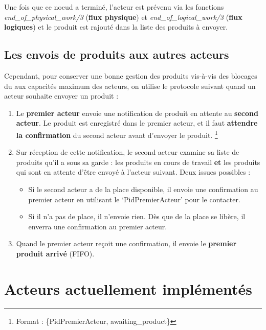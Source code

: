 \documentclass[12pt,a4paper]{article}
\begin{document}
			Une fois que ce noeud a terminé, l'acteur est prévenu via les
			fonctions \textit{end\_of\_physical\_work/3} (\textbf{flux physique})
			et \textit{end\_of\_logical\_work/3} (\textbf{flux logiques}) et le produit
			est rajouté dans la liste des produits à envoyer.

		\subsection{Les envois de produits aux autres acteurs}
			Cependant, pour conserver une bonne gestion des produits vis-à-vis
			des blocages du aux capacités maximum des acteurs, on utilise le 
			protocole suivant quand un acteur souhaite envoyer un produit :

			\begin{enumerate}
				\item Le \textbf{premier acteur} envoie une notification de produit
					en attente au \textbf{second acteur}. Le produit est 
					enregistré dans le premier acteur, et il faut 
					\textbf{attendre la confirmation} du second acteur avant
					d'envoyer le produit.
					\footnote{Format : \{PidPremierActeur, awaiting\_product\}}
				
				\item Sur réception de cette notification, le second acteur 
					examine sa liste de produits qu'il a sous sa garde :
					les produits en cours de travail \textbf{et} les produits
					qui sont en attente d'être envoyé à l'acteur suivant.
					Deux issues possibles :
					\begin{itemize}
						\item Si le second acteur a de la place disponible, 
							il envoie une confirmation au premier acteur en
							utilisant le `PidPremierActeur' pour le contacter.
						\item Si il n'a pas de place, il n'envoie rien. Dès 
							que de la place se libère, il enverra une 
							confirmation au premier acteur.
					\end{itemize}

				\item Quand le premier acteur reçoit une confirmation,
					il envoie le \textbf{premier produit arrivé} (FIFO).
			\end{enumerate}

	\section{Acteurs actuellement implémentés}
	
\end{document}
